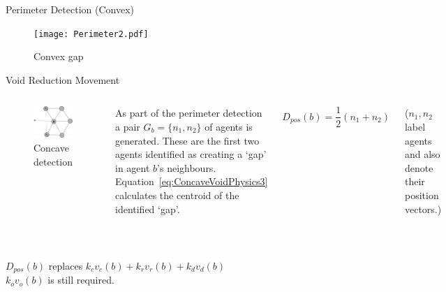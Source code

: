 \documentclass{beamer}
\begin{document}
\begin{frame}{Perimeter Detection (Convex)}
  \begin{figure}
    \begin{center}
      \texttt{[image: Perimeter2.pdf]}
    \end{center}
    \caption{Convex gap}
  \end{figure}
\end{frame}

\begin{frame}{Void Reduction Movement}
  \begin{columns}
    \begin{figure}
      \begin{center}
        \includegraphics[width=5cm]{VoidConcave1.pdf}
      \end{center}
      \caption{Concave detection}
    \end{figure}
    As part of the perimeter detection a pair $G_b = \{n_1, n_2\}$ of agents is generated. These are the first two agents identified as creating a `gap' in agent $b$'s neighbours. Equation~\ref{eq:ConcaveVoidPhysics3} calculates the centroid of the identified `gap'.
    \begin{center}
      \begin{equation}
      D_{pos}(b)=\frac{1}{2} (n_1 + n_2) %
      \label{eq:ConcaveVoidPhysics3}
      \end{equation}
    \end{center}
    \tiny{($n_1, n_2$ label agents and also denote their position vectors.)}\\
  \end{columns}
  ~\\
  \begin{center}
    \small{$D_{pos}(b)$ replaces $k_cv_c(b) + k_rv_r(b) + k_dv_d(b)$\\ $k_ov_o(b)$ is still required.}
  \end{center}
\end{frame}
\end{document}
